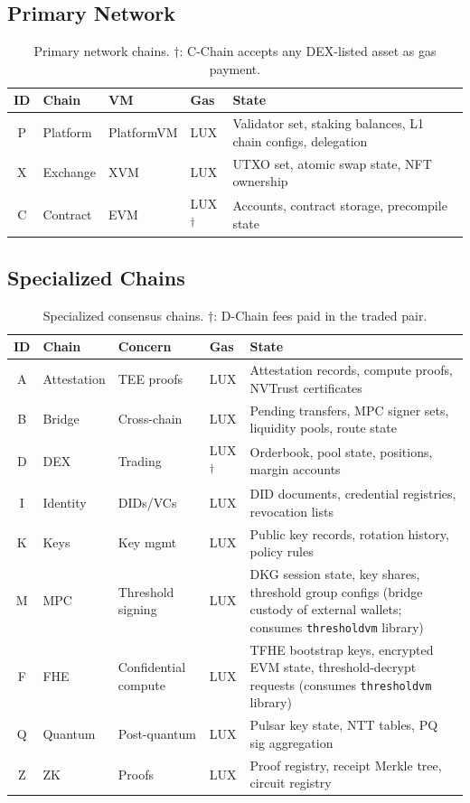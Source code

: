 \documentclass[11pt,a4paper]{article}
\begin{document}
\subsection{Primary Network}

\begin{table}[h]
\centering
\begin{tabular}{clllp{6cm}}
\toprule
\textbf{ID} & \textbf{Chain} & \textbf{VM} & \textbf{Gas} & \textbf{State} \\
\midrule
P & Platform & PlatformVM & LUX & Validator set, staking balances, L1 chain configs, delegation \\
X & Exchange & XVM & LUX & UTXO set, atomic swap state, NFT ownership \\
C & Contract & EVM & LUX\textsuperscript{$\dagger$} & Accounts, contract storage, precompile state \\
\bottomrule
\end{tabular}
\caption{Primary network chains. $\dagger$: C-Chain accepts any DEX-listed asset as gas payment.}
\end{table}

\subsection{Specialized Chains}

\begin{table}[h]
\centering
\begin{tabular}{clllp{5.5cm}}
\toprule
\textbf{ID} & \textbf{Chain} & \textbf{Concern} & \textbf{Gas} & \textbf{State} \\
\midrule
A & Attestation & TEE proofs & LUX & Attestation records, compute proofs, NVTrust certificates \\
B & Bridge & Cross-chain & LUX & Pending transfers, MPC signer sets, liquidity pools, route state \\
D & DEX & Trading & LUX\textsuperscript{$\dagger$} & Orderbook, pool state, positions, margin accounts \\
I & Identity & DIDs/VCs & LUX & DID documents, credential registries, revocation lists \\
K & Keys & Key mgmt & LUX & Public key records, rotation history, policy rules \\
M & MPC & Threshold signing & LUX & DKG session state, key shares, threshold group configs (bridge custody of external wallets; consumes \texttt{thresholdvm} library) \\
F & FHE & Confidential compute & LUX & TFHE bootstrap keys, encrypted EVM state, threshold-decrypt requests (consumes \texttt{thresholdvm} library) \\
Q & Quantum & Post-quantum & LUX & Pulsar key state, NTT tables, PQ sig aggregation \\
Z & ZK & Proofs & LUX & Proof registry, receipt Merkle tree, circuit registry \\
\bottomrule
\end{tabular}
\caption{Specialized consensus chains. $\dagger$: D-Chain fees paid in the traded pair.}
\end{table}
\end{document}

